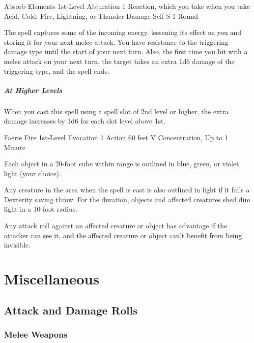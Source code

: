 \documentclass[letterpaper,openany,oneside,twocolumn]{book}
\begin{document}
\DndSpellHeader
  {Absorb Elements}
  {1st-Level Abjuration}
  {1 Reaction, which you take when you take Acid, Cold, Fire, Lightning, or Thunder Damage}
  {Self}
  {S}
  {1 Round}

The spell captures some of the incoming energy, lessening its effect on you and storing it for your next melee attack. You have resistance to the triggering damage type until the start of your next turn. Also, the first time you hit with a melee attack on your next turn, the target takes an extra 1d6 damage of the triggering type, and the spell ends.

\subparagraph*{At Higher Levels} When you cast this spell using a spell slot of 2nd level or higher, the extra damage increases by 1d6 for each slot level above 1st.

\DndSpellHeader
  {Faerie Fire}
  {1st-Level Evocation}
  {1 Action}
  {60 feet}
  {V}
  {Concentration, Up to 1 Minute}

Each object in a 20-foot cube within range is outlined in blue, green, or violet light (your choice).

Any creature in the area when the spell is cast is also outlined in light if it fails a Dexterity saving throw. For the duration, objects and affected creatures shed dim light in a 10-foot radius.

Any attack roll against an affected creature or object has advantage if the attacker can see it, and the affected creature or object can't benefit from being invisible.

\vfill\eject
\section*{Miscellaneous}
\subsection*{Attack and Damage Rolls}
\subsubsection*{Melee Weapons}
\end{document}
